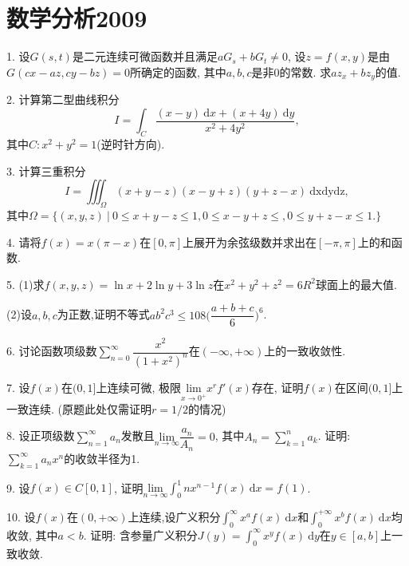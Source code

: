 \documentclass[12pt, a4paper, twoside]{ctexart}%
\newcommand{\rmd}{\mathrm{d}} %
\begin{document}
	\section{数学分析2009}
	1. 设$G(s,t)$是二元连续可微函数并且满足$aG_s + bG_t\neq 0$, 设$z=f(x,y)$是由$G(cx-az,cy-bz)=0$所确定的函数, 
	其中$a, b, c$是非0的常数. 求$az_x + bz_y$的值. \par
	2. 计算第二型曲线积分
	\[I=\int_C\frac{(x-y)\ \mathrm{d}x+(x+4y)\ \mathrm{d}y}{x^2+4y^2}, \]
	其中$C:x^2+y^2=1$(逆时针方向). \par
	3. 计算三重积分
	\[I=\iiint_\Omega(x+y-z)(x-y+z)(y+z-x)\ \mathrm{dxdydz},\]
	 其中$\Omega=\{(x,y,z)\ |\ 0\leq x+y-z\leq1, 0\leq x-y+z\leq, 0\leq y+z-x\leq1.\}$\par
	4. 请将$f(x)=x(\pi-x)$在$[0,\pi]$上展开为余弦级数并求出在$[-\pi,\pi]$上的和函数. \par 
	5. (1)求$f(x,y,z)=\ln x+2\ln y+3\ln z$在$x^2+y^2+z^2=6R^2$球面上的最大值. \par
	\hspace{1.2em}(2)设$a,b,c$为正数,证明不等式$ab^2c^3\leq108\Big(\dfrac{a+b+c}{6}\Big)^6$. \par
	6. 讨论函数项级数$\sum\limits_{n=0}^{\infty}\dfrac{x^2}{(1+x^2)^n}$在$(-\infty,+\infty)$上的一致收敛性. \par
	7. 设$f(x)$在$(0,1]$上连续可微, 极限$\underset{x\rightarrow0^+}{\mathrm{lim}}x^rf'(x)$存在, 证明$f(x)$在区间$(0,1]$上一致连续. (原题此处仅需证明$r=1/2$的情况)\par
	8. 设正项级数$\sum\limits_{n=1}^{\infty}a_n$发散且$\underset{n\rightarrow\infty}{\mathrm{lim}}\dfrac{a_n}{A_n}=0$, 其中$A_n=\sum\limits_{k=1}^{n}a_k$. 证明: $\sum\limits_{k=1}^{\infty}a_nx^n$的收敛半径为1. \par 
	9. 设$f(x)\in C[0,1]$, 证明$\underset{n\rightarrow\infty}{\mathrm{lim}}\int_0^1nx^{n-1}f(x)\ \rmd x=f(1)$. \par 
	10. 设$f(x)$在$(0,+\infty)$上连续,设广义积分$\int_0^\infty x^a f(x)\ \rmd x$和$\int_{0}^{+\infty} x^b f(x)\ \rmd x$均收敛, 其中$a<b$. 证明: 含参量广义积分$J(y)=\int_{0}^{\infty}x^yf(x)\ \rmd y$在$y\in[a,b]$上一致收敛. 
	 \clearpage
\end{document}
